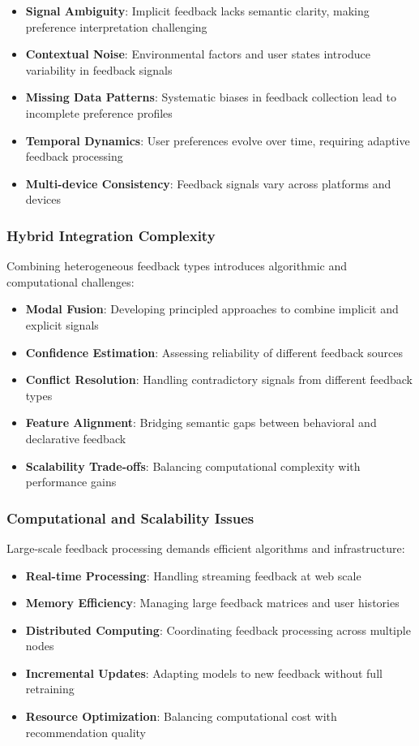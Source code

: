 \begin{itemize}
    \item \textbf{Signal Ambiguity}: Implicit feedback lacks semantic clarity, making preference interpretation challenging
    \item \textbf{Contextual Noise}: Environmental factors and user states introduce variability in feedback signals
    \item \textbf{Missing Data Patterns}: Systematic biases in feedback collection lead to incomplete preference profiles
    \item \textbf{Temporal Dynamics}: User preferences evolve over time, requiring adaptive feedback processing
    \item \textbf{Multi-device Consistency}: Feedback signals vary across platforms and devices
\end{itemize}

\subsubsection{Hybrid Integration Complexity}

Combining heterogeneous feedback types introduces algorithmic and computational challenges:

\begin{itemize}
    \item \textbf{Modal Fusion}: Developing principled approaches to combine implicit and explicit signals
    \item \textbf{Confidence Estimation}: Assessing reliability of different feedback sources
    \item \textbf{Conflict Resolution}: Handling contradictory signals from different feedback types
    \item \textbf{Feature Alignment}: Bridging semantic gaps between behavioral and declarative feedback
    \item \textbf{Scalability Trade-offs}: Balancing computational complexity with performance gains
\end{itemize}

\subsubsection{Computational and Scalability Issues}

Large-scale feedback processing demands efficient algorithms and infrastructure:

\begin{itemize}
    \item \textbf{Real-time Processing}: Handling streaming feedback at web scale
    \item \textbf{Memory Efficiency}: Managing large feedback matrices and user histories
    \item \textbf{Distributed Computing}: Coordinating feedback processing across multiple nodes
    \item \textbf{Incremental Updates}: Adapting models to new feedback without full retraining
    \item \textbf{Resource Optimization}: Balancing computational cost with recommendation quality
\end{itemize}

